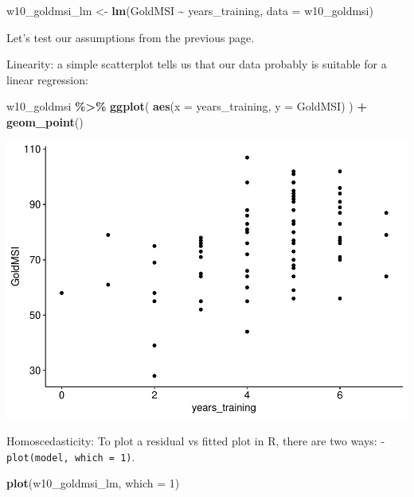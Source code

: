\documentclass[
]{book}
\newenvironment{Shaded}{\begin{snugshade}}{\end{snugshade}}
\newcommand{\AttributeTok}[1]{\textcolor[rgb]{0.13,0.29,0.53}{#1}}
\newcommand{\DecValTok}[1]{\textcolor[rgb]{0.00,0.00,0.81}{#1}}
\newcommand{\FunctionTok}[1]{\textcolor[rgb]{0.13,0.29,0.53}{\textbf{#1}}}
\newcommand{\NormalTok}[1]{#1}
\newcommand{\OtherTok}[1]{\textcolor[rgb]{0.56,0.35,0.01}{#1}}
\newcommand{\SpecialCharTok}[1]{\textcolor[rgb]{0.81,0.36,0.00}{\textbf{#1}}}
\begin{document}
\begin{Shaded}
\begin{Highlighting}[]
\NormalTok{w10\_goldmsi\_lm }\OtherTok{\textless{}{-}} \FunctionTok{lm}\NormalTok{(GoldMSI }\SpecialCharTok{\textasciitilde{}}\NormalTok{ years\_training, }\AttributeTok{data =}\NormalTok{ w10\_goldmsi)}
\end{Highlighting}
\end{Shaded}

Let's test our assumptions from the previous page.

Linearity: a simple scatterplot tells us that our data probably is suitable for a linear regression:

\begin{Shaded}
\begin{Highlighting}[]
\NormalTok{w10\_goldmsi }\SpecialCharTok{\%\textgreater{}\%}
  \FunctionTok{ggplot}\NormalTok{(}
    \FunctionTok{aes}\NormalTok{(}\AttributeTok{x =}\NormalTok{ years\_training, }\AttributeTok{y =}\NormalTok{ GoldMSI)}
\NormalTok{  ) }\SpecialCharTok{+}
  \FunctionTok{geom\_point}\NormalTok{()}
\end{Highlighting}
\end{Shaded}

\includegraphics{_main_files/figure-latex/unnamed-chunk-195-1.pdf}

Homoscedasticity: To plot a residual vs fitted plot in R, there are two ways:
- \texttt{plot(model,\ which\ =\ 1)}.

\begin{Shaded}
\begin{Highlighting}[]
\FunctionTok{plot}\NormalTok{(w10\_goldmsi\_lm, }\AttributeTok{which =} \DecValTok{1}\NormalTok{)}
\end{Highlighting}
\end{Shaded}
\end{document}
